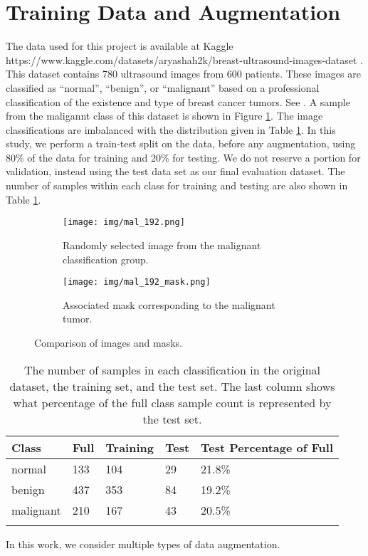 \documentclass[sn-mathphys,Numbered]{sn-jnl}%
\theoremstyle{thmstyleone}%
\theoremstyle{thmstyletwo}%
\theoremstyle{thmstylethree}%
\begin{document}
\section{Training Data and Augmentation}\label{sec_data}
The data used for this project is available at Kaggle https://www.kaggle.com/datasets/aryashah2k/breast-ultrasound-images-dataset .  This dataset contains 780 ultrasound images from 600 patients.  These images are classified as “normal”, “benign”, or “malignant” based on a professional classification of the existence and type of breast cancer tumors.  See \cite{breast_data}.  A sample from the maligannt class of this dataset is shown in Figure \ref{fig:example_mal}.  The image classifications are imbalanced with the distribution given in Table \ref{dataclasses}.  In this study, we perform a train-test split on the data, before any augmentation, using 80\% of the data for training and 20\% for testing.  We do not reserve a portion for validation, instead using the test data set as our final evaluation dataset.  The number of samples within each class for training and testing are also shown in  Table \ref{dataclasses}.

\begin{figure}
  \centering
  \begin{subfigure}[b]{0.4\textwidth}
    \texttt{[image: img/mal\_192.png]}
    \caption{Randomly selected image from the malignant classification group.}
  \end{subfigure}
  \hfill
  \begin{subfigure}[b]{0.4\textwidth}
    \texttt{[image: img/mal\_192\_mask.png]}
    \caption{Associated mask corresponding to the malignant tumor.}
  \end{subfigure}
  \caption{Comparison of images and masks.}
   \label{fig:example_mal}
\end{figure}

\begin{table}[h]
\caption{The number of samples in each classification in the original dataset, the training set, and the test set.  The last column shows what percentage of the full class sample count is represented by the test set.}\label{dataclasses}
\begin{tabular}{@{}lllll@{}}%
\toprule
Class & Full  & Training & Test & Test Percentage of Full\\
\midrule
normal & 133    & 104   & 29 & 21.8\% \\
benign & 437    & 353  & 84 & 19.2\%  \\
malignant & 210    &   167 & 43  & 20.5\%  \\
\botrule
\end{tabular}
\end{table}
In this work, we consider multiple types of data augmentation.  
\end{document}
